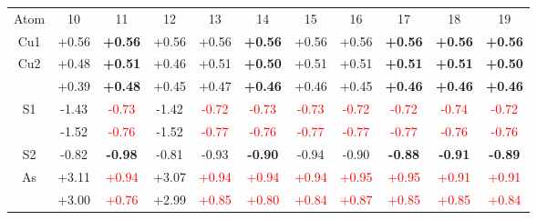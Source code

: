 \documentclass[preprint,review,12pt]{elsarticle}
\begin{document}
\begin{table}[t]
{\begin{tabular}{ccccccccccc}
Atom                  & 10   & 11   & 12   & 13   & 14   & 15   & 16   & 17   & 18   & 19 \\
Cu1                  & +0.56   & 	{\bf +0.56 }           & 	+0.56  & 	+0.56                  & 	{\bf +0.56 }           & 	+0.56                  & 	+0.56                  & 	{\bf +0.56 }           & 	{\bf +0.56 }           & 	{\bf +0.56 } \\
\multirow{2}{*}{Cu2} & +0.48   & 	{\bf +0.51 }           & 	+0.46  & 	+0.51                  & 	{\bf +0.50 }           & 	+0.51                  & 	+0.51                  & 	{\bf +0.51 }           & 	{\bf +0.51 }           & 	{\bf +0.50 } \\
		                 & +0.39   & 	{\bf +0.48 }           & 	+0.45  & 	+0.47                  & 	{\bf +0.46 }           & 	+0.46                  & 	+0.45                  & {\bf +0.46 }            & 	{\bf +0.46 }           & 	{\bf +0.46 } \\
\multirow{2}{*}{S1}  & -1.43   & 	\textcolor{red}{-0.73} & 	-1.42  & 	\textcolor{red}{-0.72} & 	\textcolor{red}{-0.73} & 	\textcolor{red}{-0.73} & 	\textcolor{red}{-0.72} & 	\textcolor{red}{-0.72} & 	\textcolor{red}{-0.74} & 	\textcolor{red}{-0.72} \\
                     & -1.52   & 	\textcolor{red}{-0.76} & 	-1.52  & 	\textcolor{red}{-0.77} & 	\textcolor{red}{-0.76} & 	\textcolor{red}{-0.77} & 	\textcolor{red}{-0.77} & 	\textcolor{red}{-0.77} & 	\textcolor{red}{-0.76} & 	\textcolor{red}{-0.76} \\
S2                   & -0.82   & 	{\bf -0.98}            & 	-0.81  & 	-0.93                  & 	{\bf -0.90 }           & 	-0.94                  & 	-0.90                  & 	{\bf -0.88 }           & 	{\bf -0.91 }           & 	{\bf -0.89 } \\
\multirow{2}{*}{As}  & +3.11   & 	\textcolor{red}{+0.94} & 	+3.07  & \textcolor{red}{+0.94}  & 	\textcolor{red}{+0.94} & 	\textcolor{red}{+0.94} & 	\textcolor{red}{+0.95} & 	\textcolor{red}{+0.95} & 	\textcolor{red}{+0.91} & 	\textcolor{red}{+0.91} \\
	                   & +3.00	 & \textcolor{red}{+0.76}	 & +2.99	 & \textcolor{red}{+0.85}	 & \textcolor{red}{+0.80}	 & \textcolor{red}{+0.84}	 & \textcolor{red}{+0.87}	 & \textcolor{red}{+0.85}	 & \textcolor{red}{+0.85}	 & \textcolor{red}{+0.84} \\
\end{tabular}}
\end{table}
\end{document}
